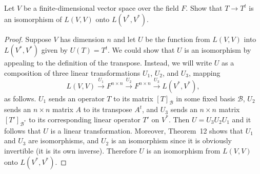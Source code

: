  Let $V$ be a finite-dimensional vector space over the field
$F$. Show that $T\to T^t$ is an isomorphism of $L(V,V)$ onto
$L(V^*,V^*)$.
\begin{proof}
  Suppose $V$ has dimension $n$ and let $U$ be the function from
  $L(V,V)$ into $L(V^*,V^*)$ given by $U(T) = T^t$. We could show that
  $U$ is an isomorphism by appealing to the definition of the
  transpose. Instead, we will write $U$ as a composition of three
  linear transformations $U_1$, $U_2$, and $U_3$, mapping
  \begin{equation*}
    L(V, V) \xrightarrow{U_1} F^{n\times n} \xrightarrow{U_2} F^{n\times n}
    \xrightarrow{U_3} L(V^*, V^*),
  \end{equation*}
  as follows. $U_1$ sends an operator $T$ to its matrix
  $[T]_{\mathcal{B}}$ in some fixed basis $\mathcal{B}$, $U_2$ sends
  an $n\times n$ matrix $A$ to its transpose $A^t$, and $U_3$ sends an
  $n\times n$ matrix $[T']_{\mathcal{B}^*}$ to its corresponding
  linear operator $T'$ on $V^*$. Then $U = U_3U_2U_1$ and it follows
  that $U$ is a linear transformation. Moreover, Theorem~12 shows that
  $U_1$ and $U_3$ are isomorphisms, and $U_2$ is an isomorphism since
  it is obviously invertible (it is its own inverse). Therefore $U$ is
  an isomorphism from $L(V,V)$ onto $L(V^*,V^*)$.
\end{proof}
